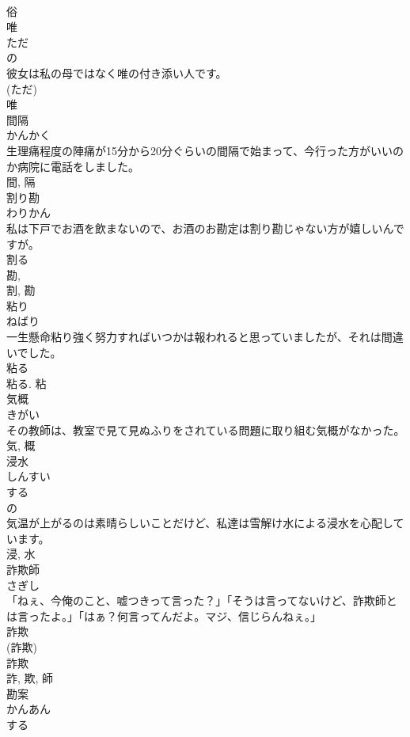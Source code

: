 \documentclass[8pt]{extreport}
\begin{document}
\begin{CJK}{UTF8}{min}
\\	俗	
\\	唯	
\\	ただ	
\\	の 
\\	彼女は私の母ではなく唯の付き添い人です。	
\\	(ただ) 
\\	唯	
\\	間隔	
\\	かんかく	
\\	生理痛程度の陣痛が15分から20分ぐらいの間隔で始まって、今行った方がいいのか病院に電話をしました。	
\\	間, 隔	
\\	割り勘	
\\	わりかん	
\\	私は下戸でお酒を飲まないので、お酒のお勘定は割り勘じゃない方が嬉しいんですが。	
\\	割る 
\\	勘, 
\\	割, 勘	
\\	粘り	
\\	ねばり	
\\	一生懸命粘り強く努力すればいつかは報われると思っていましたが、それは間違いでした。	
\\	粘る 
\\	粘る.	粘	
\\	気概	
\\	きがい	
\\	その教師は、教室で見て見ぬふりをされている問題に取り組む気概がなかった。	
\\	気, 概	
\\	浸水	
\\	しんすい	
\\	する 
\\	の 
\\	気温が上がるのは素晴らしいことだけど、私達は雪解け水による浸水を心配しています。	
\\	浸, 水	
\\	詐欺師	
\\	さぎし	
\\	「ねぇ、今俺のこと、嘘つきって言った？」「そうは言ってないけど、詐欺師とは言ったよ。」「はぁ？何言ってんだよ。マジ、信じらんねぇ。」	
\\	詐欺 
\\	(詐欺) 
\\	詐欺 
\\	詐, 欺, 師	
\\	勘案	
\\	かんあん	
\\	する 

\end{CJK}
\end{document}
